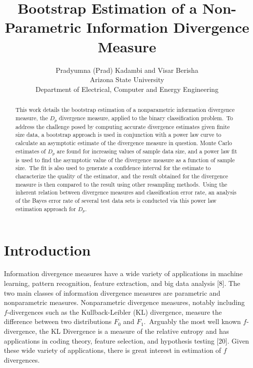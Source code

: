 \documentclass{article}
\begin{document}
	
	\title{Bootstrap Estimation of a Non-Parametric Information Divergence Measure}
	\author { Pradyumna (Prad) Kadambi and Visar Berisha \\
		\small Arizona State University \\
		\small Department of Electrical, Computer and Energy Engineering}
	\date{}
	\maketitle
	
	\begin{abstract}
		
		This work details the bootstrap estimation of a nonparametric information divergence measure, the $D_p$ divergence measure, applied to the binary classification problem.\ To address the challenge posed by computing accurate divergence estimates given finite size data, a bootstrap approach is used in conjunction with a power law curve to calculate an asymptotic estimate of the divergence measure in question. Monte Carlo estimates of $D_p$ are found for increasing values of sample data size, and a power law fit is used to find the asymptotic value of the divergence measure as a function of sample size.\ The fit is also used to generate a confidence interval for the estimate to characterize the quality of the estimator, and the result obtained for the divergence measure is then compared to the result using other resampling methods.\  Using the inherent relation between divergence measures and classification error rate, an analysis of the Bayes error rate of several test data sets is conducted via this power law estimation approach for $D_p$.
	\end{abstract}
	
	\section{Introduction} 
	Information divergence measures have a wide variety of applications in machine learning, pattern recognition, feature extraction, and big data analysis [8]. The two main classes of information divergence measures are parametric and nonparametric measures. Nonparametric divergence measures, notably including $f$-divergences such as the Kullback-Leibler (KL) divergence,  measure the difference between two distributions $F_0$ and $F_1$.\ Arguably the most well known $f$-divergence, the KL Divergence is a measure of the relative entropy and has applications in coding theory, feature selection, and hypothesis testing [20].	Given these wide variety of applications, there is great interest in estimation of $f$ divergences.
	\\ [0.5ex] %
	
\end{document}
